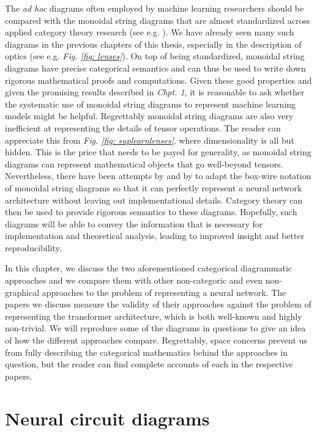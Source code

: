 \documentclass[11pt,a4paper,openright,twoside]{report}
\theoremstyle{plain}
\theoremstyle{definition}
\begin{document}
The \textit{ad hoc} diagrams often employed by machine learning researchers should be compared with the monoidal string diagrams that are almost standardized across applied category theory research (see e.g. \cite{bonchi2022string}). We have already seen many such diagrams in the previous chapters of this thesis, especially in the description of optics (see e.g. \textit{Fig. \ref{fig: lenses}}). On top of being standardized, monoidal string diagrams have precise categorical semantics and can thus be used to write down rigorous mathematical proofs and computations. Given these good properties and given the promising results described in \textit{Chpt. 1}, it is reasonable to ask whether the systematic use of monoidal string diagrams to represent machine learning models might be helpful. Regrettably monoidal string diagrams are also very inefficient at representing the details of tensor operations. The reader can appreciate this from \textit{Fig. \ref{fig: suplearnlenses}}, where dimensionality is all but hidden. This is the price that needs to be payed for generality, as monoidal string diagrams can represent mathematical objects that go well-beyond tensors. Nevertheless, there have been attempts by \cite{abbott2023robust} and by \cite{khatri2024anatomy} to adapt the box-wire notation of monoidal string diagrams so that it can perfectly represent a neural network architecture without leaving out implementational details. Category theory can then be used to provide rigorous semantics to these diagrams. Hopefully, such diagrams will be able to convey the information that is necessary for implementation and theoretical analysis, leading to improved insight and better reproducibility.

In this chapter, we discuss the two aforementioned categorical diagrammatic approaches and we compare them with other non-categoric and even non-graphical approaches to the problem of representing a neural network. The papers we discuss measure the validity of their approaches against the problem of representing the transformer architecture, which is both well-known and highly non-trivial. We will reproduce some of the diagrams in questions to give an idea of how the different approaches compare. Regrettably, space concerns prevent us from fully describing the categorical mathematics behind the approaches in question, but the reader can find complete accounts of each in the respective papers.





\section{Neural circuit diagrams}
\end{document}
